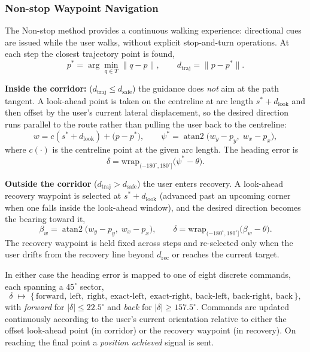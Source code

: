 \documentclass[12pt]{report}
\begin{document}
\subsubsection*{Non-stop Waypoint Navigation}

The Non-stop method provides a continuous walking experience: directional cues are issued while the user walks, without explicit stop-and-turn operations. At each step the closest trajectory point is found,
\[
p^\ast=\arg\min_{q\in T}\lVert q-p\rVert ,
\qquad
d_{\text{traj}}=\lVert p-p^\ast\rVert .
\]

\textbf{Inside the corridor:} ($d_{\text{traj}}\le d_{\text{safe}}$) the guidance does \emph{not} aim at the path tangent. A look-ahead point is taken on the centreline at arc length $s^\ast+d_{\text{look}}$ and then offset by the user's current lateral displacement, so the desired direction runs parallel to the route rather than pulling the user back to the centreline:
\[
w = c(s^\ast+d_{\text{look}}) + \bigl(p-p^\ast\bigr),
\qquad
\psi^\ast=\operatorname{atan2}\!\bigl(w_y-p_y,\;w_x-p_x\bigr),
\]
where $c(\cdot)$ is the centreline point at the given arc length. The heading error is
\[
\delta=\mathrm{wrap}_{(-180^\circ,180^\circ]}\!\bigl(\psi^\ast-\theta\bigr).
\]

\textbf{Outside the corridor} ($d_{\text{traj}}>d_{\text{safe}}$) the user enters recovery. A look-ahead recovery waypoint is selected at $s^\ast+d_{\text{look}}$ (advanced past an upcoming corner when one falls inside the look-ahead window), and the desired direction becomes the bearing toward it,
\[
\beta_w=\operatorname{atan2}\!\bigl(w_y-p_y,\;w_x-p_x\bigr),
\qquad
\delta=\mathrm{wrap}_{(-180^\circ,180^\circ]}\!\bigl(\beta_w-\theta\bigr).
\]
The recovery waypoint is held fixed across steps and re-selected only when the user drifts from the recovery line beyond $d_{\text{rec}}$ or reaches the current target.

In either case the heading error is mapped to one of eight discrete commands, each spanning a $45^\circ$ sector,
\[
\delta\;\longmapsto\;
\bigl\{\,
\text{forward},\ \text{left},\ \text{right},\ \text{exact-left},\
\text{exact-right},\ \text{back-left},\ \text{back-right},\ \text{back}\,
\bigr\},
\]
with \textit{forward} for $|\delta|\le 22.5^\circ$ and \textit{back} for $|\delta|\ge 157.5^\circ$. Commands are updated continuously according to the user's current orientation relative to either the offset look-ahead point (in corridor) or the recovery waypoint (in recovery). On reaching the final point a \textit{position achieved} signal is sent.
\end{document}
